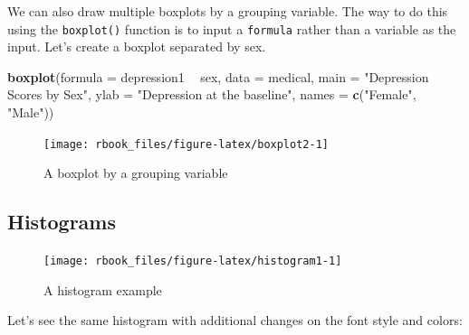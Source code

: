 \documentclass[]{book}
\newenvironment{Shaded}{\begin{snugshade}}{\end{snugshade}}
\newcommand{\DataTypeTok}[1]{\textcolor[rgb]{0.13,0.29,0.53}{#1}}
\newcommand{\KeywordTok}[1]{\textcolor[rgb]{0.13,0.29,0.53}{\textbf{#1}}}
\newcommand{\NormalTok}[1]{#1}
\newcommand{\OperatorTok}[1]{\textcolor[rgb]{0.81,0.36,0.00}{\textbf{#1}}}
\newcommand{\StringTok}[1]{\textcolor[rgb]{0.31,0.60,0.02}{#1}}
\begin{document}
We can also draw multiple boxplots by a grouping variable. The way to do this using the \texttt{boxplot()} function is to input a \texttt{formula} rather than a variable as the input. Let's create a boxplot separated by sex.

\begin{Shaded}
\begin{Highlighting}[]
\KeywordTok{boxplot}\NormalTok{(}\DataTypeTok{formula =}\NormalTok{ depression1 }\OperatorTok{~}\StringTok{ }\NormalTok{sex,}
        \DataTypeTok{data =}\NormalTok{ medical,}
        \DataTypeTok{main =} \StringTok{"Depression Scores by Sex"}\NormalTok{,}
        \DataTypeTok{ylab =} \StringTok{"Depression at the baseline"}\NormalTok{,}
        \DataTypeTok{names =} \KeywordTok{c}\NormalTok{(}\StringTok{"Female"}\NormalTok{, }\StringTok{"Male"}\NormalTok{))}
\end{Highlighting}
\end{Shaded}

\begin{figure}

{\centering \texttt{[image: rbook\_files/figure-latex/boxplot2-1]} 

}

\caption{A boxplot by a grouping variable}\label{fig:boxplot2}
\end{figure}

\hypertarget{histograms}{%
\subsection{Histograms}\label{histograms}}

\begin{Shaded}
\end{Shaded}

\begin{figure}

{\centering \texttt{[image: rbook\_files/figure-latex/histogram1-1]} 

}

\caption{A histogram example}\label{fig:histogram1}
\end{figure}

Let's see the same histogram with additional changes on the font style and colors:
\end{document}
